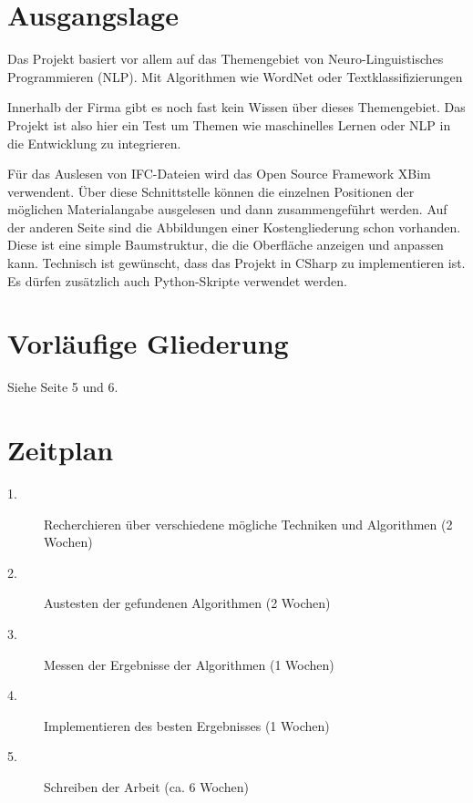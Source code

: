 \begin{onehalfspace}
\section{Ausgangslage}

Das Projekt basiert vor allem auf das Themengebiet von Neuro-Linguistisches Programmieren (NLP). Mit Algorithmen wie WordNet oder Textklassifizierungen 

Innerhalb der Firma gibt es noch fast kein Wissen über dieses Themengebiet. Das Projekt ist also hier ein Test um Themen wie maschinelles Lernen oder NLP in die Entwicklung zu integrieren.

Für das Auslesen von IFC-Dateien wird das Open Source Framework XBim verwendent. Über diese Schnittstelle können die einzelnen Positionen der möglichen Materialangabe ausgelesen und dann zusammengeführt werden. Auf der anderen Seite sind die Abbildungen einer Kostengliederung schon vorhanden. Diese ist eine simple Baumstruktur, die die Oberfläche anzeigen und anpassen kann.
Technisch ist gewünscht, dass das Projekt in CSharp zu implementieren ist. Es dürfen zusätzlich auch Python-Skripte verwendet werden.

\section{Vorläufige Gliederung}
Siehe Seite 5 und 6.

\section{Zeitplan}

\begin{description}
	\item[1.]
	Recherchieren über verschiedene mögliche Techniken und Algorithmen (2 Wochen)
	\item[2.] 
	Austesten der gefundenen Algorithmen (2 Wochen)
	\item[3.]
	Messen der Ergebnisse der Algorithmen (1 Wochen)
	\item[4.] Implementieren des besten Ergebnisses (1 Wochen)
	\item[5.] Schreiben der Arbeit (ca. 6 Wochen)
\end{description}


\end{onehalfspace}